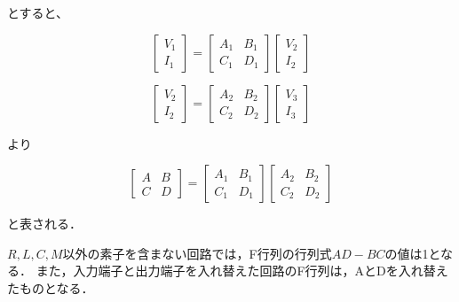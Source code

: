 とすると、

$$
\left[\begin{array}{l}
V_1 \\
I_1
\end{array}\right]=\left[\begin{array}{ll}
A_1 & B_1 \\
C_1 & D_1
\end{array}\right]\left[\begin{array}{l}
V_2 \\
I_2
\end{array}\right]
$$

$$
\left[\begin{array}{c}
V_2 \\
I_2
\end{array}\right]=\left[\begin{array}{ll}
A_2 & B_2 \\
C_2 & D_2
\end{array}\right]\left[\begin{array}{l}
V_3 \\
I_3
\end{array}\right]
$$

より

$$
\left[\begin{array}{ll}
A & B \\
C & D
\end{array}\right]=\left[\begin{array}{ll}
A_1 & B_1 \\
C_1 & D_1
\end{array}\right]\left[\begin{array}{ll}
A_2 & B_2 \\
C_2 & D_2
\end{array}\right]
$$

と表される．


$R,L,C,M$以外の素子を含まない回路では，F行列の行列式$AD-BC$の値は1となる．
また，入力端子と出力端子を入れ替えた回路のF行列は，AとDを入れ替えたものとなる．